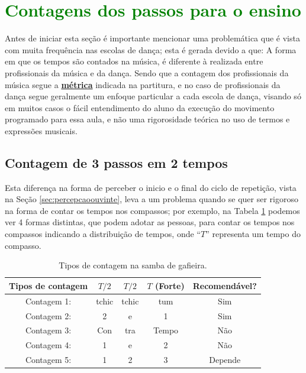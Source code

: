 \section{\textcolor{green}{Contagens dos passos para o ensino}}
Antes de iniciar esta seção é importante mencionar uma
problemática que é vista com muita frequência nas escolas de dança; 
esta é gerada devido a que: A forma em que os tempos são contados 
na música, é
diferente à realizada entre profissionais da música e da dança. 
Sendo que a contagem dos profissionais da música segue a \hyperref[def:Metrica]{\textbf{métrica}} indicada na partitura,
e no caso de profissionais da dança segue geralmente um enfoque 
particular a cada escola de dança, visando só em muitos casos o fácil entendimento do aluno da
execução do movimento programado para essa aula, e não uma rigorosidade teórica no uso de termos e 
expressões musicais.




\subsection{Contagem de 3 passos em 2 tempos}
Esta diferença na forma de perceber o inicio e o final do ciclo de repetição,
vista na Seção \ref{sec:percepcaoouvinte}, 
leva a um problema quando se quer ser rigoroso na forma de contar os tempos nos compassos; 
por exemplo, na Tabela \ref{tab:ritmo1} 
podemos ver 4 formas distintas, que podem adotar as pessoas, 
para contar os tempos nos compassos indicando a distribuição de tempos, 
onde ``$T$'' representa um tempo do compasso.
\begin{table}[ht]
  \centering
  \begin{tabular}    {c|ccc|c}
    \hline
    Tipos de contagem       & $T/2$ & $T/2$   & $T$ (Forte) & Recomendável?\\
    \hline
    Contagem 1: & tchic  & tchic  & tum   & Sim\\
    Contagem 2: & 2     & e     & 1     & Sim\\ \hline
    Contagem 3: & Con   & tra  & Tempo & Não\\
    Contagem 4: & 1     & e     & 2     & Não\\  \hline
    Contagem 5: & 1     & 2     & 3     & Depende\\ \hline
    \hline
  \end{tabular}
  \caption{Tipos de contagem na samba de gafieira.}
\label{tab:ritmo1}
\end{table}

